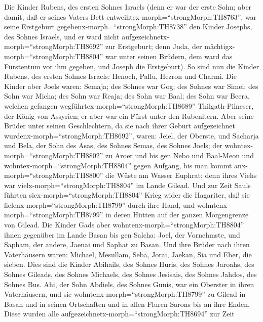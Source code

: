  Die Kinder Rubens, des ersten Sohnes Israels (denn er war
der erste Sohn; aber damit, daß er seines Vaters Bett
entweihtex-morph=``strongMorph:TH8763'', war seine Erstgeburt
gegebenx-morph=``strongMorph:TH8738'' den Kinder Josephs, des Sohnes
Israels, und er ward nicht aufgezeichnetx-morph=``strongMorph:TH8692''
zur Erstgeburt;  denn Juda, der
mächtigx-morph=``strongMorph:TH8804'' war unter seinen Brüdern, dem ward
das Fürstentum vor ihm gegeben, und Joseph die Erstgeburt). 
So sind nun die Kinder Rubens, des ersten Sohnes Israels: Henoch, Pallu,
Hezron und Charmi.  Die Kinder aber Joels waren: Semaja; des
Sohnes war Gog; des Sohnes war Simei;  des Sohn war Micha;
des Sohn war Reaja; des Sohn war Baal;  des Sohn war Beera,
welchen gefangen wegführtex-morph=``strongMorph:TH8689''
Thilgath-Pilneser, der König von Assyrien; er aber war ein Fürst unter
den Rubenitern.  Aber seine Brüder unter seinen
Geschlechtern, da sie nach ihrer Geburt aufgezeichnet
wurdenx-morph=``strongMorph:TH8692'', waren: Jeiel, der Oberste, und
Sacharja  und Bela, der Sohn des Asas, des Sohnes Semas, des
Sohnes Joels; der wohntex-morph=``strongMorph:TH8802'' zu Aroer und bis
gen Nebo und Baal-Meon  und
wohntex-morph=``strongMorph:TH8804'' gegen Aufgang, bis man kommt
anx-morph=``strongMorph:TH8800'' die Wüste am Wasser Euphrat; denn ihres
Viehs war vielx-morph=``strongMorph:TH8804'' im Lande Gilead.
 Und zur Zeit Sauls führten
siex-morph=``strongMorph:TH8804'' Krieg wider die Hagariter, daß sie
fielenx-morph=``strongMorph:TH8799'' durch ihre Hand, und
wohntenx-morph=``strongMorph:TH8799'' in deren Hütten auf der ganzen
Morgengrenze von Gilead.  Die Kinder Gads aber
wohntenx-morph=``strongMorph:TH8804'' ihnen gegenüber im Lande Basan bis
gen Salcha:  Joel, der Vornehmste, und Sapham, der andere,
Jaenai und Saphat zu Basan.  Und ihre Brüder nach ihren
Vaterhäusern waren: Michael, Mesullam, Seba, Jorai, Jaekan, Sia und
Eber, die sieben.  Dies sind die Kinder Abihails, des
Sohnes Huris, des Sohnes Jaroahs, des Sohnes Gileads, des Sohnes
Michaels, des Sohnes Jesisais, des Sohnes Jahdos, des Sohnes Bus.
 Ahi, der Sohn Abdiels, des Sohnes Gunis, war ein Oberster
in ihren Vaterhäusern,  und sie
wohntenx-morph=``strongMorph:TH8799'' zu Gilead in Basan und in seinen
Ortschaften und in allen Fluren Sarons bis an ihre Enden. 
Diese wurden alle aufgezeichnetx-morph=``strongMorph:TH8694'' zur Zeit
